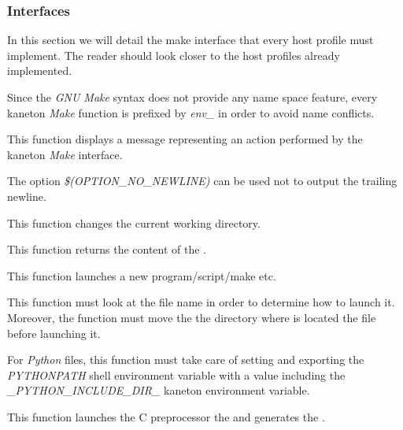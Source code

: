 \subsubsection{Interfaces}



In this section we will detail the make interface that every host profile
must implement. The reader should look closer to the host profiles already
implemented.

Since the \textit{GNU Make} syntax does not provide any name space feature,
every kaneton \textit{Make} function is prefixed by \textit{env\_} in order
to avoid name conflicts.

         {
	   This function displays a message representing an action performed
	   by the kaneton \textit{Make} interface.

	   \-

	   The option \textit{\$(OPTION\_NO\_NEWLINE)} can be used not to
	   output the trailing newline.
	 }

         {
	   This function changes the current working directory.
	 }

         {
	   This function returns the content of the .
	 }

         {
	   This function launches a new program/script/make etc.

	   \-

	   This function must look at the file name in order to determine
	   how to launch it. Moreover, the function must move the the
	   directory where is located the file before launching it.

	   \-

	   For \textit{Python} files, this function must take care of
	   setting and exporting the \textit{PYTHONPATH} shell environment
	   variable with a value including the
	   \textit{\_PYTHON\_INCLUDE\_DIR\_} kaneton environment variable.
	 }

         {
	   This function launches the C preprocessor the 
	   and generates the .
	 }

